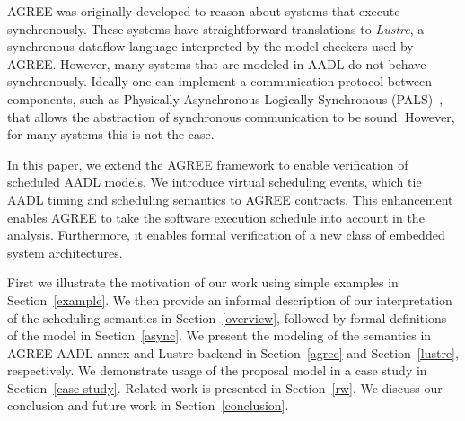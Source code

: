 AGREE was originally developed to reason about systems that execute synchronously. These systems have straightforward translations to \emph{Lustre}, a synchronous dataflow language interpreted by the model checkers used by AGREE. However, many systems that are modeled in AADL do not behave synchronously. Ideally one can implement a communication protocol between components, such as Physically Asynchronous Logically Synchronous (PALS)~\cite{pals}, that allows the abstraction of synchronous communication to be sound. However, for many systems this is not the case.

In this paper, we extend the AGREE framework to enable verification of scheduled AADL models. We introduce virtual scheduling events, which tie AADL timing and scheduling semantics to AGREE contracts. This enhancement enables AGREE to take the software execution schedule into account in the analysis. Furthermore, it enables formal verification of a new class of embedded system architectures. 

First we illustrate the motivation of our work using simple examples in Section~\ref{example}. We then provide an informal description of our interpretation of the scheduling semantics in Section~\ref{overview}, followed by formal definitions of the model in Section~\ref{async}. We present the modeling of the semantics in AGREE AADL annex and Lustre backend in Section~\ref{agree} and Section~\ref{lustre}, respectively. We demonstrate usage of the proposal model in a case study in Section~\ref{case-study}. Related work is presented in Section~\ref{rw}.  We discuss our conclusion and future work in Section~\ref{conclusion}.  